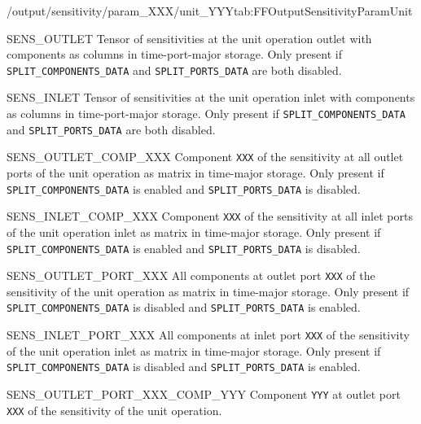 \begin{groupscope}{/output/sensitivity/param\_XXX/unit\_YYY}{tab:FFOutputSensitivityParamUnit}
\begin{dataset}[type=double,unit={\si{\mol\per\cubic\metre\of{IV}\per\ParamUnit}}]{SENS\_OUTLET}
    Tensor of sensitivities at the unit operation outlet with components as columns in time-port-major storage.
    Only present if \texttt{SPLIT\_COMPONENTS\_DATA} and \texttt{SPLIT\_PORTS\_DATA} are both disabled.
  \end{dataset}
  \begin{dataset}[type=double,unit={\si{\mol\per\cubic\metre\of{IV}\per\ParamUnit}}]{SENS\_INLET}
    Tensor of sensitivities at the unit operation inlet with components as columns in time-port-major storage.
    Only present if \texttt{SPLIT\_COMPONENTS\_DATA} and \texttt{SPLIT\_PORTS\_DATA} are both disabled.
  \end{dataset}
  \begin{dataset}[type=double,unit={\si{\mol\per\cubic\metre\of{IV}\per\ParamUnit}}]{SENS\_OUTLET\_COMP\_XXX}
    Component \texttt{XXX} of the sensitivity at all outlet ports of the unit operation as matrix in time-major storage.
    Only present if \texttt{SPLIT\_COMPONENTS\_DATA} is enabled and \texttt{SPLIT\_PORTS\_DATA} is disabled.
  \end{dataset}
  \begin{dataset}[type=double,unit={\si{\mol\per\cubic\metre\of{IV}\per\ParamUnit}}]{SENS\_INLET\_COMP\_XXX}
    Component \texttt{XXX} of the sensitivity at all inlet ports of the unit operation inlet as matrix in time-major storage.
    Only present if \texttt{SPLIT\_COMPONENTS\_DATA} is enabled and \texttt{SPLIT\_PORTS\_DATA} is disabled.
  \end{dataset}
  \begin{dataset}[type=double,unit={\si{\mol\per\cubic\metre\of{IV}\per\ParamUnit}}]{SENS\_OUTLET\_PORT\_XXX}
    All components at outlet port \texttt{XXX} of the sensitivity of the unit operation as matrix in time-major storage.
    Only present if \texttt{SPLIT\_COMPONENTS\_DATA} is disabled and \texttt{SPLIT\_PORTS\_DATA} is enabled.
  \end{dataset}
  \begin{dataset}[type=double,unit={\si{\mol\per\cubic\metre\of{IV}\per\ParamUnit}}]{SENS\_INLET\_PORT\_XXX}
    All components at inlet port \texttt{XXX} of the sensitivity of the unit operation inlet as matrix in time-major storage.
    Only present if \texttt{SPLIT\_COMPONENTS\_DATA} is disabled and \texttt{SPLIT\_PORTS\_DATA} is enabled.
  \end{dataset}
  \begin{dataset}[type=double,unit={\si{\mol\per\cubic\metre\of{IV}\per\ParamUnit}}]{SENS\_OUTLET\_PORT\_XXX\_COMP\_YYY}
    Component \texttt{YYY} at outlet port \texttt{XXX} of the sensitivity of the unit operation.

\end{dataset}
\end{groupscope}
